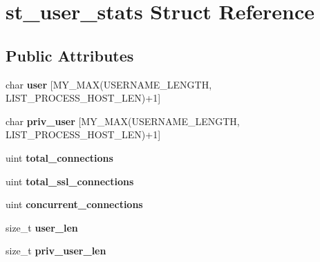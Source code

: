 \hypertarget{structst__user__stats}{}\section{st\+\_\+user\+\_\+stats Struct Reference}
\label{structst__user__stats}
\subsection*{Public Attributes}
\begin{DoxyCompactItemize}
\item 
\mbox{\label{structst__user__stats_a1cf6d4e6f5ffff55ebd0f45bf7345764}} 
char {\bfseries user} \mbox{[}M\+Y\+\_\+\+M\+AX(U\+S\+E\+R\+N\+A\+M\+E\+\_\+\+L\+E\+N\+G\+TH, L\+I\+S\+T\+\_\+\+P\+R\+O\+C\+E\+S\+S\+\_\+\+H\+O\+S\+T\+\_\+\+L\+EN)+1\mbox{]}
\item 
\mbox{\label{structst__user__stats_aa63ab84862e32a28ff85434169f3198b}} 
char {\bfseries priv\+\_\+user} \mbox{[}M\+Y\+\_\+\+M\+AX(U\+S\+E\+R\+N\+A\+M\+E\+\_\+\+L\+E\+N\+G\+TH, L\+I\+S\+T\+\_\+\+P\+R\+O\+C\+E\+S\+S\+\_\+\+H\+O\+S\+T\+\_\+\+L\+EN)+1\mbox{]}
\item 
\mbox{\label{structst__user__stats_a8a81c4ecd6ceeb0fee38b3fbf9c31da1}} 
uint {\bfseries total\+\_\+connections}
\item 
\mbox{\label{structst__user__stats_ad499e751462b3ec9cde1dd26bc877b92}} 
uint {\bfseries total\+\_\+ssl\+\_\+connections}
\item 
\mbox{\label{structst__user__stats_aa989e4a43c128761693a2f70a7b9ae6c}} 
uint {\bfseries concurrent\+\_\+connections}
\item 
\mbox{\label{structst__user__stats_ab0aea684cf178e25cabeb8fd364a9647}} 
size\+\_\+t {\bfseries user\+\_\+len}
\item 
\mbox{\label{structst__user__stats_afb1ce5c2a72d238a0cc053da1454ca9e}} 
size\+\_\+t {\bfseries priv\+\_\+user\+\_\+len}
\item 
\mbox{\label{structst__user__stats_ac35624ecb91a49842b1378fb143e417f}} 

\end{DoxyCompactItemize}
